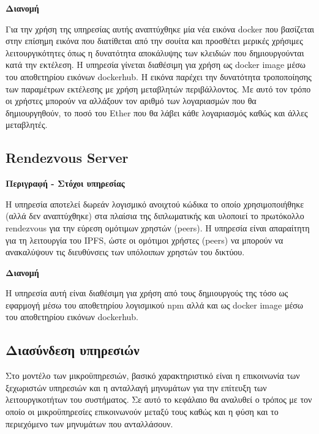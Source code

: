 \vspace{0.5cm}
\textbf{Διανομή}

Για την χρήση της υπηρεσίας αυτής αναπτύχθηκε μία νέα εικόνα docker που βασίζεται στην επίσημη εικόνα που διατίθεται από την σουίτα και προσθέτει μερικές χρήσιμες λειτουργικότητες όπως η δυνατότητα αποκάλυψης των κλειδιών που δημιουργούνται κατά την εκτέλεση. Η υπηρεσία γίνεται διαθέσιμη για χρήση ως docker image μέσω του αποθετηρίου εικόνων dockerhub. Η εικόνα παρέχει την δυνατότητα τροποποίησης των παραμέτρων εκτέλεσης με χρήση μεταβλητών περιβάλλοντος. Με αυτό τον τρόπο οι χρήστες μπορούν να αλλάξουν τον αριθμό των λογαριασμών που θα δημιουργηθούν, το ποσό του Ether που θα λάβει κάθε λογαριασμός καθώς και άλλες μεταβλητές.

\subsection{Rendezvous Server} \label{subsection:4-4-rendezvous-server-service}

\vspace{0.5cm}
\textbf{Περιγραφή - Στόχοι υπηρεσίας}

Η υπηρεσία αποτελεί δωρεάν λογισμικό ανοιχτού κώδικα το οποίο χρησιμοποιήθηκε (αλλά δεν αναπτύχθηκε) στα πλαίσια της διπλωματικής και υλοποιεί το πρωτόκολλο rendezvous για την εύρεση ομότιμων χρηστών (peers). Η υπηρεσία είναι απαραίτητη για τη λειτουργία του IPFS, ώστε οι ομότιμοι χρήστες (peers) να μπορούν να ανακαλύψουν τις διευθύνσεις των υπόλοιπων χρηστών του δικτύου.

\vspace{0.5cm}
\textbf{Διανομή}

Η υπηρεσία αυτή είναι διαθέσιμη για χρήση από τους δημιουργούς της τόσο ως εφαρμογή μέσω του αποθετηρίου λογισμικού npm αλλά και ως docker image μέσω του αποθετηρίου εικόνων dockerhub.

\subsection{Διασύνδεση υπηρεσιών} \label{subsection:4-4-service-communication}

Στο μοντέλο των μικροϋπηρεσιών, βασικό χαρακτηριστικό είναι η επικοινωνία των ξεχωριστών υπηρεσιών και η ανταλλαγή μηνυμάτων για την επίτευξη των λειτουργικοτήτων του συστήματος. Σε αυτό το κεφάλαιο θα αναλυθεί ο τρόπος με τον οποίο οι μικροϋπηρεσίες επικοινωνούν μεταξύ τους καθώς και η φύση και το περιεχόμενο των μηνυμάτων που ανταλλάσουν.

